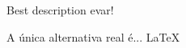 \documentclass[aspectratio=43,14pt]{beamer}
\begin{document}
{%
\begin{frame}[b]
    \begin{center}
        \Huge Best description evar!
    \end{center}
\end{frame}
}

\begin{frame}
    \begin{center}
        A única alternativa real é...
        \vfill
        \Huge \LaTeX
    \end{center}
\end{frame}
\end{document}
